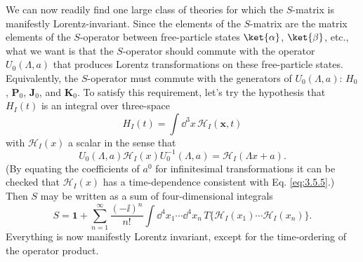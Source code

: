We can now readily find one large class of theories for which the $S$-matrix is manifestly
Lorentz-invariant. Since the elements of the $S$-matrix are the matrix elements of the
$S$-operator between free-particle states $\ket{\alpha}$, $\ket{\beta}$, etc., what we want is
that the $S$-operator should commute with the operator $U_0(\Lambda,a)$ that produces Lorentz
transformations on these free-particle states. Equivalently, the $S$-operator must commute with
the generators of $U_0(\Lambda,a)$: $H_0$, $\mathbf{P}_0$, $\mathbf{J}_0$, and $\mathbf{K}_0$.
To satisfy this requirement, let's try the hypothesis that $H_I(t)$ is an integral over
three-space
\begin{equation}
 H_I(t)=\int \dd^3x\,\mathcal{H}_I(\mathbf{x},t)
 \tag{3.5.11}\label{eq:3.5.11}
\end{equation}
with $\mathcal{H}_I(x)$ a scalar in the sense that
\begin{equation}
 U_0(\Lambda,a)\mathcal{H}_I(x)U_0^{-1}(\Lambda,a)
 =\mathcal{H}_I(\Lambda x+a).
 \tag{3.5.12}\label{eq:3.5.12}
\end{equation}
(By equating the coefficients of $a^0$ for infinitesimal transformations it can be checked that
$\mathcal{H}_I(x)$ has a time-dependence consistent with Eq. \eqref{eq:3.5.5}.) Then $S$ may be written
as a sum of four-dimensional integrals
\begin{equation}
 S=\mathbf{1}+\sum_{n=1}^{\infty}\frac{(-\ii)^n}{n!}
 \int \dd^4x_1\cdots \dd^4x_n\,
 T\{\mathcal{H}_I(x_1)\cdots\mathcal{H}_I(x_n)\}.
 \tag{3.5.13}\label{eq:3.5.13}
\end{equation}
Everything is now manifestly Lorentz invariant, except for the time-ordering of the operator
product.

